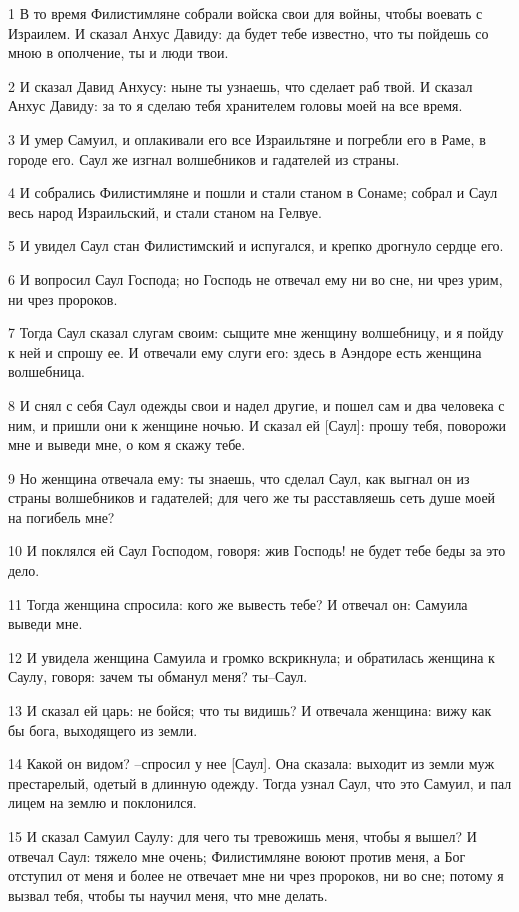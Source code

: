 \par 1 В то время Филистимляне собрали войска свои для войны, чтобы воевать с Израилем. И сказал Анхус Давиду: да будет тебе известно, что ты пойдешь со мною в ополчение, ты и люди твои.
\par 2 И сказал Давид Анхусу: ныне ты узнаешь, что сделает раб твой. И сказал Анхус Давиду: за то я сделаю тебя хранителем головы моей на все время.
\par 3 И умер Самуил, и оплакивали его все Израильтяне и погребли его в Раме, в городе его. Саул же изгнал волшебников и гадателей из страны.
\par 4 И собрались Филистимляне и пошли и стали станом в Сонаме; собрал и Саул весь народ Израильский, и стали станом на Гелвуе.
\par 5 И увидел Саул стан Филистимский и испугался, и крепко дрогнуло сердце его.
\par 6 И вопросил Саул Господа; но Господь не отвечал ему ни во сне, ни чрез урим, ни чрез пророков.
\par 7 Тогда Саул сказал слугам своим: сыщите мне женщину волшебницу, и я пойду к ней и спрошу ее. И отвечали ему слуги его: здесь в Аэндоре есть женщина волшебница.
\par 8 И снял с себя Саул одежды свои и надел другие, и пошел сам и два человека с ним, и пришли они к женщине ночью. И сказал ей [Саул]: прошу тебя, поворожи мне и выведи мне, о ком я скажу тебе.
\par 9 Но женщина отвечала ему: ты знаешь, что сделал Саул, как выгнал он из страны волшебников и гадателей; для чего же ты расставляешь сеть душе моей на погибель мне?
\par 10 И поклялся ей Саул Господом, говоря: жив Господь! не будет тебе беды за это дело.
\par 11 Тогда женщина спросила: кого же вывесть тебе? И отвечал он: Самуила выведи мне.
\par 12 И увидела женщина Самуила и громко вскрикнула; и обратилась женщина к Саулу, говоря: зачем ты обманул меня? ты--Саул.
\par 13 И сказал ей царь: не бойся; что ты видишь? И отвечала женщина: вижу как бы бога, выходящего из земли.
\par 14 Какой он видом? --спросил у нее [Саул]. Она сказала: выходит из земли муж престарелый, одетый в длинную одежду. Тогда узнал Саул, что это Самуил, и пал лицем на землю и поклонился.
\par 15 И сказал Самуил Саулу: для чего ты тревожишь меня, чтобы я вышел? И отвечал Саул: тяжело мне очень; Филистимляне воюют против меня, а Бог отступил от меня и более не отвечает мне ни чрез пророков, ни во сне; потому я вызвал тебя, чтобы ты научил меня, что мне делать.
